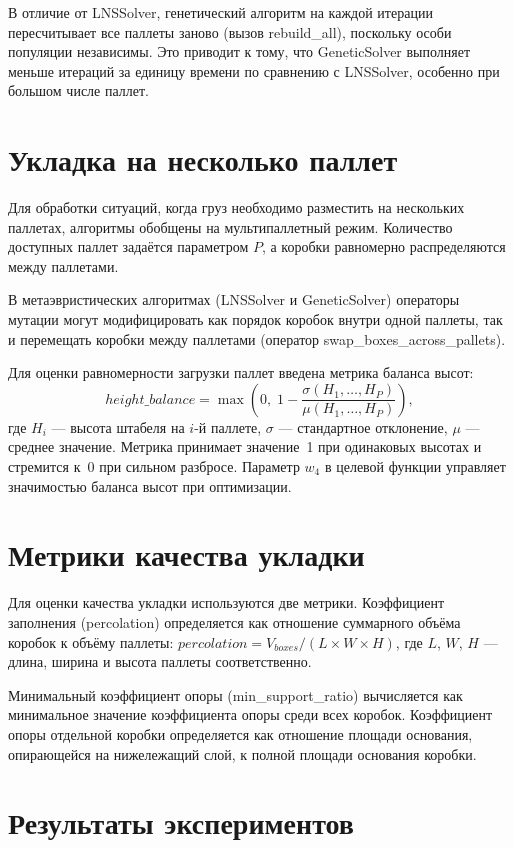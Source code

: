 В отличие от LNSSolver, генетический алгоритм на каждой итерации пересчитывает все паллеты заново (вызов rebuild\_all), поскольку особи популяции независимы. Это приводит к тому, что GeneticSolver выполняет меньше итераций за единицу времени по сравнению с LNSSolver, особенно при большом числе паллет.

\section{Укладка на несколько паллет}
\label{sec:evyukh_multipallet}

Для обработки ситуаций, когда груз необходимо разместить на нескольких паллетах, алгоритмы обобщены на мультипаллетный режим. Количество доступных паллет задаётся параметром $P$, а коробки равномерно распределяются между паллетами.

В метаэвристических алгоритмах (LNSSolver и GeneticSolver) операторы мутации могут модифицировать как порядок коробок внутри одной паллеты, так и перемещать коробки между паллетами (оператор swap\_boxes\_across\_pallets).

Для оценки равномерности загрузки паллет введена метрика баланса высот:
\[
height\_balance = \max\!\left(0,\; 1 - \frac{\sigma(H_1, \ldots, H_P)}{\mu(H_1, \ldots, H_P)}\right),
\]
где $H_i$ --- высота штабеля на $i$-й паллете, $\sigma$ --- стандартное отклонение, $\mu$ --- среднее значение. Метрика принимает значение~1 при одинаковых высотах и стремится к~0 при сильном разбросе. Параметр $w_4$ в целевой функции управляет значимостью баланса высот при оптимизации.

\section{Метрики качества укладки}

Для оценки качества укладки используются две метрики. Коэффициент заполнения (percolation) определяется как отношение суммарного объёма коробок к объёму паллеты: $percolation = V_{boxes} / (L \times W \times H)$, где $L$, $W$, $H$ --- длина, ширина и высота паллеты соответственно.

Минимальный коэффициент опоры (min\_support\_ratio) вычисляется как минимальное значение коэффициента опоры среди всех коробок. Коэффициент опоры отдельной коробки определяется как отношение площади основания, опирающейся на нижележащий слой, к полной площади основания коробки.

\section{Результаты экспериментов}

